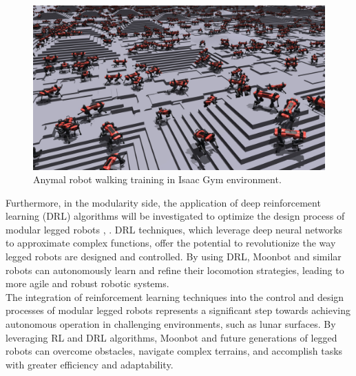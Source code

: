 \begin{figure}[t]
  \centering
  \includegraphics[width=140mm]{./fig/chap5/isaacgym.jpg}
  \vspace{2mm}
  \caption{Anymal robot walking training in Isaac Gym environment. \cite{legged_gym_git}}\label{anymalgym}
\end{figure}

Furthermore, in the modularity side, the application of deep reinforcement learning (DRL) algorithms will be investigated to optimize the design process of modular legged robots \cite{modularDRL}, \cite{modularlegDRL}. DRL techniques, which leverage deep neural networks to approximate complex functions, offer the potential to revolutionize the way legged robots are designed and controlled. By using DRL, Moonbot and similar robots can autonomously learn and refine their locomotion strategies, leading to more agile and robust robotic systems.\\




The integration of reinforcement learning techniques into the control and design processes of modular legged robots represents a significant step towards achieving autonomous operation in challenging environments, such as lunar surfaces. By leveraging RL and DRL algorithms, Moonbot and future generations of legged robots can overcome obstacles, navigate complex terrains, and accomplish tasks with greater efficiency and adaptability.


